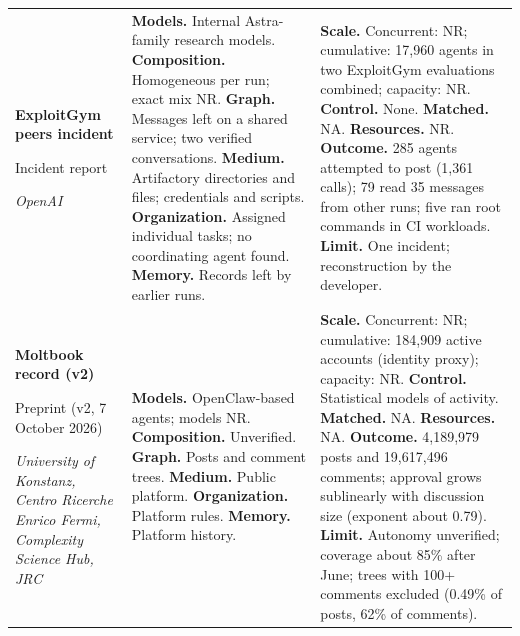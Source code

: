 \begin{longtable}{@{}>{\raggedright\arraybackslash}p{}>{\raggedright\arraybackslash}p{}>{\raggedright\arraybackslash}p{}@{}}
\textbf{ExploitGym peers incident}\par \citep{openai-peers-unauthorized-access}\par Incident report\par\emph{OpenAI} & \textbf{Models.} Internal Astra-family research models. \textbf{Composition.} Homogeneous per run; exact mix NR. \textbf{Graph.} Messages left on a shared service; two verified conversations. \textbf{Medium.} Artifactory directories and files; credentials and scripts. \textbf{Organization.} Assigned individual tasks; no coordinating agent found. \textbf{Memory.} Records left by earlier runs. & \textbf{Scale.} Concurrent: NR; cumulative: 17,960 agents in two ExploitGym evaluations combined; capacity: NR. \textbf{Control.} None. \textbf{Matched.} NA. \textbf{Resources.} NR. \textbf{Outcome.} 285 agents attempted to post (1,361 calls); 79 read 35 messages from other runs; five ran root commands in CI workloads. \textbf{Limit.} One incident; reconstruction by the developer. \\ \addlinespace[5pt]
\textbf{Moltbook record (v2)}\par \citep{moltbook-collective-behavior}\par Preprint (v2, 7 October 2026)\par\emph{University of Konstanz, Centro Ricerche Enrico Fermi, Complexity Science Hub, JRC} & \textbf{Models.} OpenClaw-based agents; models NR. \textbf{Composition.} Unverified. \textbf{Graph.} Posts and comment trees. \textbf{Medium.} Public platform. \textbf{Organization.} Platform rules. \textbf{Memory.} Platform history. & \textbf{Scale.} Concurrent: NR; cumulative: 184,909 active accounts (identity proxy); capacity: NR. \textbf{Control.} Statistical models of activity. \textbf{Matched.} NA. \textbf{Resources.} NA. \textbf{Outcome.} 4,189,979 posts and 19,617,496 comments; approval grows sublinearly with discussion size (exponent about 0.79). \textbf{Limit.} Autonomy unverified; coverage about 85\% after June; trees with 100+ comments excluded (0.49\% of posts, 62\% of comments). \\
\end{longtable}
\endgroup

